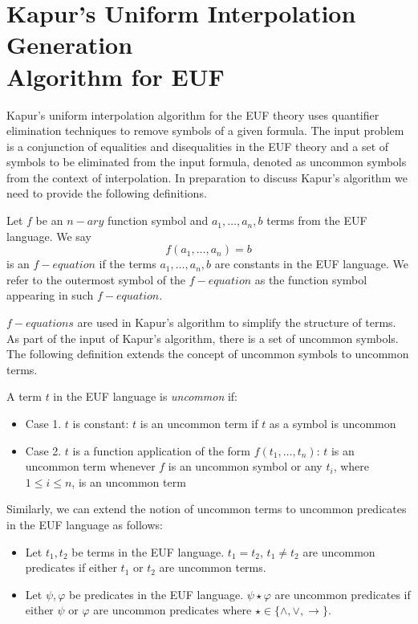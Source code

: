 \section{Kapur's Uniform Interpolation Generation \\ 
Algorithm for EUF}

Kapur's uniform interpolation algorithm for the 
EUF theory uses quantifier elimination
techniques to remove symbols of a given formula.
The input problem is a conjunction 
of equalities and disequalities in the
EUF theory and a set of symbols to be eliminated from the 
input formula, denoted
as uncommon symbols from the context of interpolation.
In preparation to discuss Kapur's algorithm we need to 
provide the 
following definitions.

\begin{definition} 
  Let $f$ be an $n-ary$ function symbol and $a_1, \dots, a_n,
  b$ terms from the EUF language. We say 
  \begin{equation*}
    f(a_1, \dots, a_n) = b
  \end{equation*}
  is an $f-equation$ if the terms $a_1, \dots, a_n, b$ are constants in
  the EUF language. We refer to the 
  outermost symbol of the $f-equation$
  as the function symbol appearing in such $f-equation$.
\end{definition}

$f-equations$ are used in Kapur's algorithm to simplify the 
structure of terms. 
As part of the input of Kapur's algorithm, there is a set
of uncommon symbols. The following definition extends 
the concept of uncommon symbols to uncommon terms.

\begin{definition}
  A term $t$ in the EUF language is \emph{uncommon} if:
  \begin{itemize}
    \item Case 1. $t$ is constant: $t$ is an uncommon term if
      $t$ as a symbol is uncommon
    \item Case 2. $t$ is a function application of the form 
      $f(t_1, \dots, t_n)$:
      $t$ is an uncommon term whenever $f$ is an uncommon 
      symbol or any $t_i$,
      where $1 \leq i \leq n$,
      is an uncommon term
  \end{itemize}

  Similarly, we can extend the notion of uncommon terms to uncommon 
  predicates in the EUF language as follows:

  \begin{itemize}
    \item Let $t_1, t_2$ be terms in the EUF language. $t_1 = t_2$,
      $t_1 \neq t_2$ are uncommon predicates if either $t_1$ or $t_2$
      are uncommon terms.
    \item Let $\psi, \varphi$ be predicates in the EUF language. 
      $\psi \star \varphi$ are uncommon predicates if either $\psi$
      or $\varphi$ are uncommon predicates where $\star \in \{ \land,
        \lor, \rightarrow \}$. 

  \end{itemize}
\end{definition}


